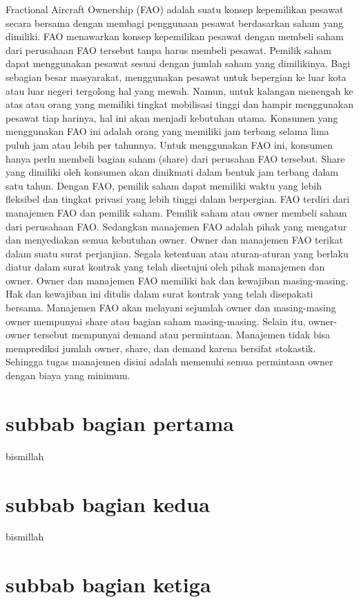 Fractional Aircraft Ownership (FAO) adalah suatu konsep kepemilikan pesawat secara bersama dengan membagi penggunaan pesawat berdasarkan saham yang dimiliki. FAO menawarkan konsep kepemilikan pesawat dengan membeli saham dari perusahaan FAO tersebut tanpa harus membeli pesawat. Pemilik saham dapat menggunakan pesawat sesuai dengan jumlah saham yang dimilikinya. 
Bagi sebagian besar masyarakat, menggunakan pesawat untuk bepergian ke luar kota atau luar negeri tergolong hal yang mewah. Namun, untuk kalangan menengah ke atas atau orang yang memiliki tingkat mobilisasi tinggi dan hampir menggunakan pesawat tiap harinya, hal ini akan menjadi kebutuhan utama. Konsumen yang menggunakan FAO ini adalah orang yang memiliki jam terbang selama lima puluh jam atau lebih per tahunnya.
Untuk menggunakan FAO ini, konsumen hanya perlu membeli bagian saham (share) dari perusahan FAO tersebut. Share yang dimiliki oleh konsumen akan dinikmati dalam bentuk jam terbang dalam satu tahun. Dengan FAO, pemilik saham dapat memiliki waktu yang lebih fleksibel dan tingkat privasi yang lebih tinggi dalam berpergian.
FAO terdiri dari manajemen FAO dan pemilik saham. Pemilik saham atau owner membeli saham dari perusahaan FAO. Sedangkan manajemen FAO adalah pihak yang mengatur dan menyediakan semua kebutuhan owner. Owner dan manajemen FAO terikat dalam suatu surat perjanjian. Segala ketentuan atau aturan-aturan yang berlaku diatur dalam surat kontrak yang telah disetujui oleh pihak manajemen dan owner. Owner dan manajemen FAO memiliki hak dan kewajiban masing-masing. Hak dan kewajiban ini ditulis dalam surat kontrak yang telah disepakati bersama. 
Manajemen FAO akan melayani sejumlah owner dan masing-masing owner mempunyai share atau bagian saham masing-masing. Selain itu, owner-owner tersebut mempunyai demand atau permintaan. Manajemen tidak bisa memprediksi jumlah owner, share, dan demand karena bersifat stokastik. Sehingga tugas manajemen disini adalah memenuhi semua permintaan owner dengan biaya yang minimum.
\section{subbab bagian pertama}
bismillah
\section{subbab bagian kedua}
bismillah
\section{subbab bagian ketiga}